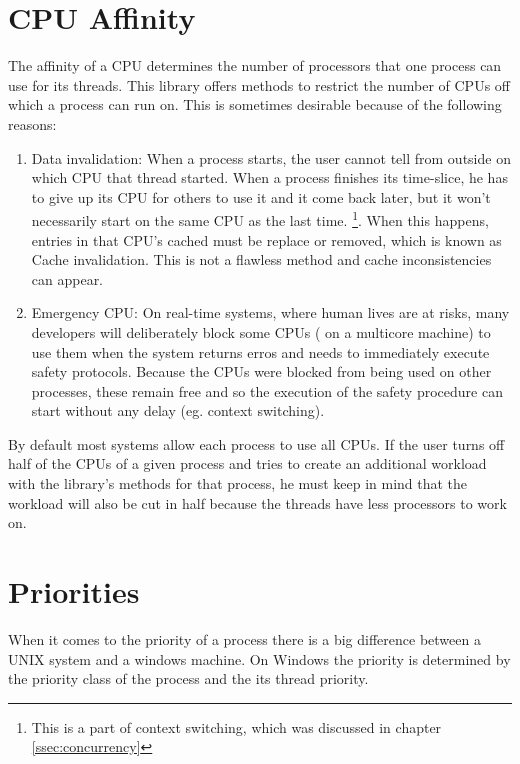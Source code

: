 \section{CPU Affinity}
The affinity of a CPU determines the number of processors that one process can use for its threads.
This library offers methods to restrict the number of CPUs off which a process can run on. This is
sometimes desirable because of the following reasons:
\begin{enumerate}
	\item Data invalidation: When a process starts, the user cannot tell from outside on which CPU
	that thread started. When a process finishes its time-slice, he has to give up its CPU for
	others to use it and it come back later, but it won't necessarily start on the same CPU as the
	last time. \footnote{This is a part of context switching, which was discussed in chapter \ref{ssec:concurrency}}. When this happens, entries in that CPU's cached must be replace or removed,
	which is known as \dq Cache invalidation\dq{}. This is not a flawless method and cache inconsistencies
	can appear.
	\item Emergency CPU: On real-time systems, where human lives are at risks, many developers will
	deliberately block some CPUs ( on a multicore machine) to use them when the system returns
	erros and needs to immediately execute safety protocols. Because the CPUs were blocked
	from being used on other processes, these remain free and so the execution of the safety procedure can start without any delay (eg. context switching).
	
\end{enumerate}

By default most systems allow each process to use all CPUs. If the user turns off half of the
CPUs of a given process and tries to create an additional workload with the library's methods for that process, he must keep in
mind that the workload will also be cut in half because the threads have less processors to work on.
\section{Priorities}
When it comes to the priority of a process there is a big difference between a UNIX system and a
windows machine. On Windows the priority is determined by the priority class of the process and the
its thread priority.\\

